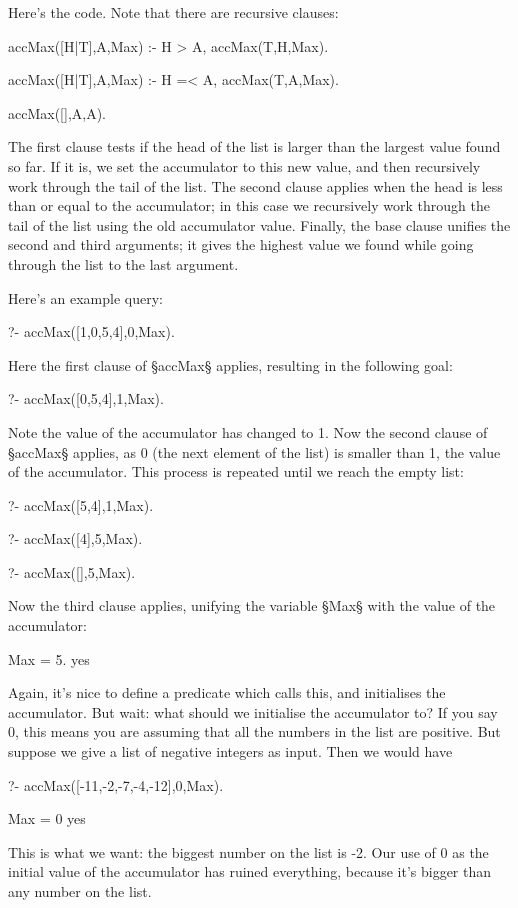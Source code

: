 Here's the code.  Note that there are  recursive clauses:
\begin{LPNcodedisplay}
accMax([H|T],A,Max) :-
   H > A,
   accMax(T,H,Max).

accMax([H|T],A,Max) :-
   H =< A,
   accMax(T,A,Max).

accMax([],A,A).
\end{LPNcodedisplay}
The first clause tests if the head of the list is larger than the
largest value found so far.  If it is, we set the accumulator to this
new value, and then recursively work through the tail of the list.
The second clause applies when the head is less than or equal to the
accumulator; in this case we recursively work through the tail of the
list using the old accumulator value.  Finally, the base clause
unifies the second and third arguments; it gives the highest value we
found while going through the list to the last argument.

Here's an
example query:
\begin{LPNcodedisplay}
?- accMax([1,0,5,4],0,Max).
\end{LPNcodedisplay}
Here the first clause of §accMax§ applies, resulting in the following
goal:
\begin{LPNcodedisplay}
?- accMax([0,5,4],1,Max).
\end{LPNcodedisplay}
Note the value of the accumulator has changed to 1.  Now the second
clause of §accMax§ applies, as 0 (the next element of the list) is
smaller than 1, the value of the accumulator.
This process is repeated until
we reach the empty list:
\begin{LPNcodedisplay}
?- accMax([5,4],1,Max).

?- accMax([4],5,Max).

?- accMax([],5,Max).
\end{LPNcodedisplay}
Now the third clause applies, unifying the variable §Max§
with the value of the accumulator:
\begin{LPNcodedisplay}
Max = 5.
yes
\end{LPNcodedisplay}

Again, it's nice to define a predicate which calls this, and
initialises the accumulator.  But wait: what should we initialise the
accumulator to?  If you say 0, this means you are assuming that all
the numbers in the list are positive. But suppose we give
a list of negative integers as input. Then we would have
\begin{LPNcodedisplay}
?- accMax([-11,-2,-7,-4,-12],0,Max).

Max = 0
yes
\end{LPNcodedisplay}
This is  what we want: the biggest number on the list is
-2.  Our use of 0 as the initial value of the accumulator has ruined
everything, because it's bigger than any number on the list.

